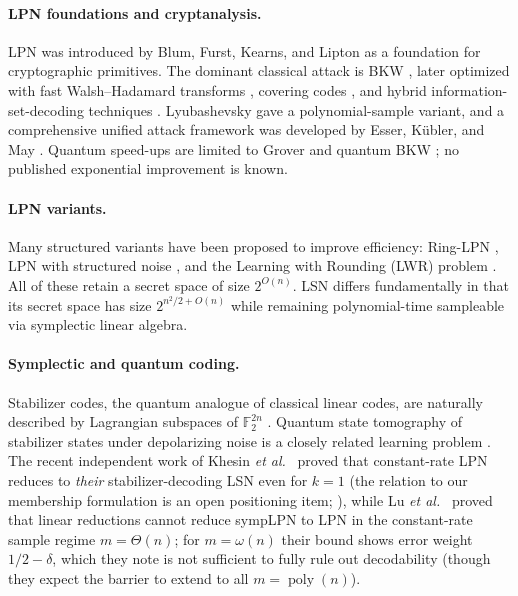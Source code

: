 \documentclass[11pt,a4paper]{article}
\theoremstyle{plain}
\theoremstyle{definition}
\newcommand{\F}{\mathbb{F}}
\newcommand{\etal}{\textit{et al.}}
\begin{document}
\paragraph{LPN foundations and cryptanalysis.}
LPN was introduced by Blum, Furst, Kearns, and Lipton \cite{BFKL94} as a foundation for cryptographic primitives. The dominant classical attack is BKW \cite{BKW03}, later optimized with fast Walsh--Hadamard transforms \cite{LF06}, covering codes \cite{GJL14,ZJW16}, and hybrid information-set-decoding techniques \cite{EKM17,WS21}. Lyubashevsky \cite{Lyu05} gave a polynomial-sample variant, and a comprehensive unified attack framework was developed by Esser, K{\"u}bler, and May \cite{EKM17}. Quantum speed-ups are limited to Grover \cite{Gro96} and quantum BKW \cite{Kir11}; no published exponential improvement is known.

\paragraph{LPN variants.}
Many structured variants have been proposed to improve efficiency: Ring-LPN \cite{HKL+12}, LPN with structured noise \cite{DP12}, and the Learning with Rounding (LWR) problem \cite{BPR12}. All of these retain a secret space of size $2^{O(n)}$. LSN differs fundamentally in that its secret space has size $2^{n^2/2 + O(n)}$ while remaining polynomial-time sampleable via symplectic linear algebra.

\paragraph{Symplectic and quantum coding.}
Stabilizer codes, the quantum analogue of classical linear codes, are naturally described by Lagrangian subspaces of $\F_2^{2n}$ \cite{Got97,CRSS98,NC00}. Quantum state tomography of stabilizer states under depolarizing noise is a closely related learning problem \cite{GL22}. The recent independent work of Khesin \etal\ \cite{KLP+25} proved that constant-rate LPN reduces to \emph{their} stabilizer-decoding LSN even for $k=1$ (the relation to our membership formulation is an open positioning item; ), while Lu \etal\ \cite{LPQR26} proved that linear reductions cannot reduce sympLPN to LPN in the constant-rate sample regime $m=\Theta(n)$; for $m=\omega(n)$ their bound shows error weight $1/2-\delta$, which they note is not sufficient to fully rule out decodability (though they expect the barrier to extend to all $m=\operatorname{poly}(n)$).
\end{document}
